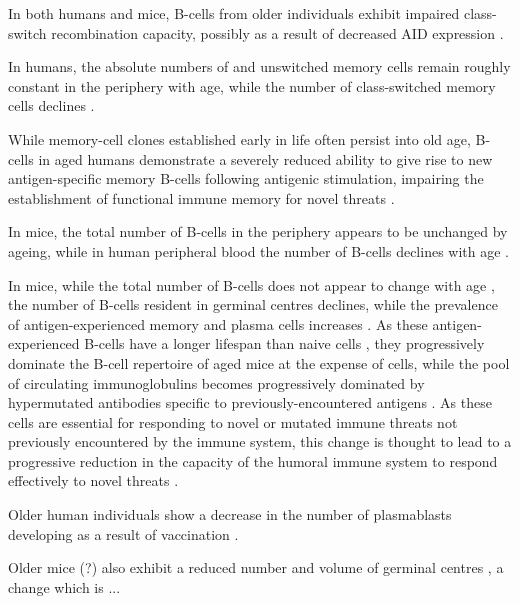 In both humans and mice, B-cells from older individuals exhibit impaired class-switch recombination capacity, possibly as a result of decreased AID expression \parencite{montecino2013immunosenescence,blomberg2013age}.

In humans, the absolute numbers of \naive and unswitched memory cells remain roughly constant in the periphery with age, while the number of class-switched memory cells declines \parencite{blomberg2013age}.

While memory-cell clones established early in life often persist into old age, \naive B-cells in aged humans demonstrate a severely reduced ability to give rise to new antigen-specific memory B-cells following antigenic stimulation, impairing the establishment of functional immune memory for novel threats \parencite{aberle2013mechanistic}.

In mice, the total number of B-cells in the periphery appears to be unchanged by ageing, while in human peripheral blood the number of B-cells declines with age \parencite{montecino2013immunosenescence,aberle2013mechanistic}. 

In mice, while the total number of B-cells does not appear to change with age \parencite{montecino2013immunosenescence}, the number of \naive B-cells resident in germinal centres declines, while the prevalence of antigen-experienced memory and plasma cells increases \parencite{mehr2011reversing,kogut2012bcells}. As these antigen-experienced B-cells have a longer lifespan than naive cells \parencite{kogut2012bcells}, they progressively dominate the B-cell repertoire of aged mice at the expense of \naive cells, while the pool of circulating immunoglobulins becomes progressively dominated by hypermutated antibodies specific to previously-encountered antigens \parencite{kogut2012bcells}. As these \naive cells are essential for responding to novel or mutated immune threats not previously encountered by the immune system, this change is thought to lead to a progressive reduction in the capacity of the humoral immune system to respond effectively to novel threats \parencite{kogut2012bcells}.



Older human individuals show a decrease in the number of plasmablasts developing as a result of vaccination \parencite{montecino2013immunosenescence}.

Older mice (?) also exhibit a reduced number and volume of germinal centres \parencite{mehr2011reversing}, a change which is ...

